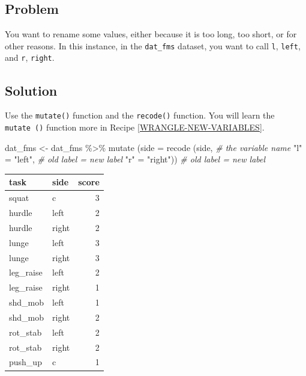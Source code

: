 \documentclass[
]{book}
\newenvironment{Shaded}{\begin{snugshade}}{\end{snugshade}}
\newcommand{\AttributeTok}[1]{\textcolor[rgb]{0.77,0.63,0.00}{#1}}
\newcommand{\CommentTok}[1]{\textcolor[rgb]{0.56,0.35,0.01}{\textit{#1}}}
\newcommand{\FunctionTok}[1]{\textcolor[rgb]{0.00,0.00,0.00}{#1}}
\newcommand{\NormalTok}[1]{#1}
\newcommand{\OtherTok}[1]{\textcolor[rgb]{0.56,0.35,0.01}{#1}}
\newcommand{\SpecialCharTok}[1]{\textcolor[rgb]{0.00,0.00,0.00}{#1}}
\newcommand{\StringTok}[1]{\textcolor[rgb]{0.31,0.60,0.02}{#1}}
\begin{document}
\hypertarget{problem-7}{%
\subsection{Problem}\label{problem-7}}

You want to rename some values, either because it is too long, too short, or for other reasons. In this instance, in the \texttt{dat\_fms} dataset, you want to call \texttt{l}, \texttt{left}, and \texttt{r}, \texttt{right}.

\hypertarget{solution-7}{%
\subsection{Solution}\label{solution-7}}

Use the \texttt{mutate()} function and the \texttt{recode()} function. You will learn the \texttt{mutate\ ()} function more in Recipe \ref{WRANGLE-NEW-VARIABLES}.

\begin{Shaded}
\begin{Highlighting}[]
\NormalTok{dat\_fms }\OtherTok{\textless{}{-}}\NormalTok{ dat\_fms }\SpecialCharTok{\%\textgreater{}\%}
  \FunctionTok{mutate}\NormalTok{ (}\AttributeTok{side =} \FunctionTok{recode}\NormalTok{ (side, }\CommentTok{\# the variable name}
                          \StringTok{"l"} \OtherTok{=} \StringTok{"left"}\NormalTok{, }\CommentTok{\# old label = new label}
                          \StringTok{"r"} \OtherTok{=} \StringTok{"right"}\NormalTok{)) }\CommentTok{\# old label = new label}
\end{Highlighting}
\end{Shaded}

\begin{tabular}{l|l|r}
\hline
task & side & score\\
\hline
squat & c & 3\\
\hline
hurdle & left & 2\\
\hline
hurdle & right & 2\\
\hline
lunge & left & 3\\
\hline
lunge & right & 3\\
\hline
leg\_raise & left & 2\\
\hline
leg\_raise & right & 1\\
\hline
shd\_mob & left & 1\\
\hline
shd\_mob & right & 2\\
\hline
rot\_stab & left & 2\\
\hline
rot\_stab & right & 2\\
\hline
push\_up & c & 1\\
\hline
\end{tabular}
\end{document}
